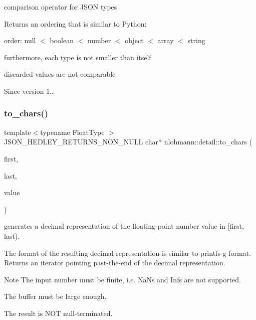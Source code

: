comparison operator for J\+S\+ON types 

Returns an ordering that is similar to Python\+:
\begin{DoxyItemize}
\item order\+: null $<$ boolean $<$ number $<$ object $<$ array $<$ string
\item furthermore, each type is not smaller than itself
\item discarded values are not comparable
\end{DoxyItemize}

\begin{DoxySince}{Since}
version 1.. 
\end{DoxySince}
\mbox{\label{namespacenlohmann_1_1detail_a6cca370ac6c99294dbe4fe24716a57dd}} 
\subsubsection{\texorpdfstring{to\+\_\+chars()}{to\_chars()}}
{\footnotesize\ttfamily template$<$typename Float\+Type $>$ \\
J\+S\+O\+N\+\_\+\+H\+E\+D\+L\+E\+Y\+\_\+\+R\+E\+T\+U\+R\+N\+S\+\_\+\+N\+O\+N\+\_\+\+N\+U\+LL char$\ast$ nlohmann\+::detail\+::to\+\_\+chars (\begin{DoxyParamCaption}\item[{char $\ast$}]{first,  }\item[{const char $\ast$}]{last,  }\item[{Float\+Type}]{value }\end{DoxyParamCaption})}



generates a decimal representation of the floating-\/point number value in \mbox{[}first, last). 

The format of the resulting decimal representation is similar to printf\textquotesingle{}s g format. Returns an iterator pointing past-\/the-\/end of the decimal representation.

\begin{DoxyNote}{Note}
The input number must be finite, i.\+e. NaN\textquotesingle{}s and Inf\textquotesingle{}s are not supported. 

The buffer must be large enough. 

The result is N\+OT null-\/terminated. 
\end{DoxyNote}
\mbox{\label{namespacenlohmann_1_1detail_a1a804b98cbe89b7e44b698f2ca860490}} 
